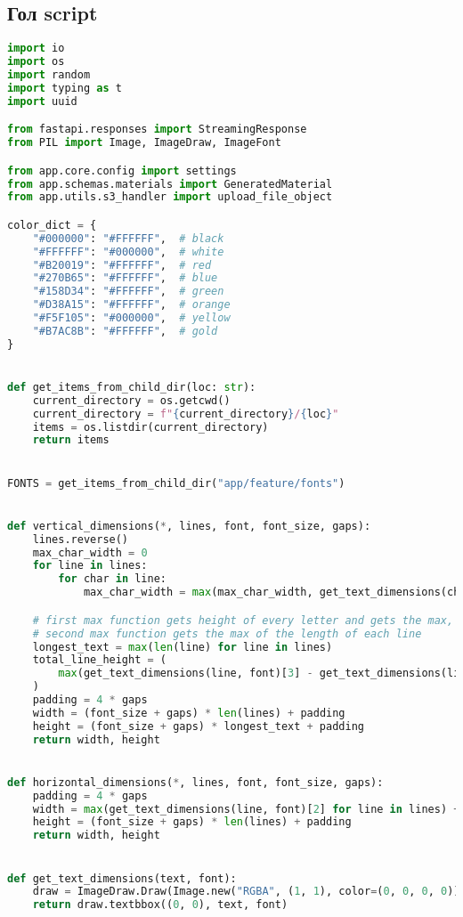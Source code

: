 \subsection{Гол script}
\begin{lstlisting}[language=Python,caption={Text-ээс PNG зураг үүсгэдэг script},frame=single]
	import io
import os
import random
import typing as t
import uuid

from fastapi.responses import StreamingResponse
from PIL import Image, ImageDraw, ImageFont

from app.core.config import settings
from app.schemas.materials import GeneratedMaterial
from app.utils.s3_handler import upload_file_object

color_dict = {
    "#000000": "#FFFFFF",  # black
    "#FFFFFF": "#000000",  # white
    "#B20019": "#FFFFFF",  # red
    "#270B65": "#FFFFFF",  # blue
    "#158D34": "#FFFFFF",  # green
    "#D38A15": "#FFFFFF",  # orange
    "#F5F105": "#000000",  # yellow
    "#B7AC8B": "#FFFFFF",  # gold
}


def get_items_from_child_dir(loc: str):
    current_directory = os.getcwd()
    current_directory = f"{current_directory}/{loc}"
    items = os.listdir(current_directory)
    return items


FONTS = get_items_from_child_dir("app/feature/fonts")


def vertical_dimensions(*, lines, font, font_size, gaps):
    lines.reverse()
    max_char_width = 0
    for line in lines:
        for char in line:
            max_char_width = max(max_char_width, get_text_dimensions(char, font)[2])

    # first max function gets height of every letter and gets the max,
    # second max function gets the max of the length of each line
    longest_text = max(len(line) for line in lines)
    total_line_height = (
        max(get_text_dimensions(line, font)[3] - get_text_dimensions(line, font)[1] for line in lines) * longest_text
    )
    padding = 4 * gaps
    width = (font_size + gaps) * len(lines) + padding
    height = (font_size + gaps) * longest_text + padding
    return width, height


def horizontal_dimensions(*, lines, font, font_size, gaps):
    padding = 4 * gaps
    width = max(get_text_dimensions(line, font)[2] for line in lines) + padding
    height = (font_size + gaps) * len(lines) + padding
    return width, height


def get_text_dimensions(text, font):
    draw = ImageDraw.Draw(Image.new("RGBA", (1, 1), color=(0, 0, 0, 0)))
    return draw.textbbox((0, 0), text, font)



\end{lstlisting}
